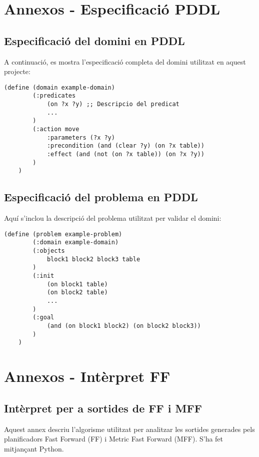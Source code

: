 \documentclass[a4paper]{article}
\begin{document}
	\newpage
	\appendix
	\section{Annexos - Especificació PDDL}
	
	\subsection{Especificació del domini en PDDL}
	
	A continuació, es mostra l'especificació completa del domini utilitzat en aquest projecte:
	
	\begin{lstlisting}[language=PDDL, caption={Especificació del domini en PDDL}, label={lst:dominiPDDL}]
	(define (domain example-domain)
		(:predicates
			(on ?x ?y) ;; Descripcio del predicat
			...
		)
		(:action move
			:parameters (?x ?y)
			:precondition (and (clear ?y) (on ?x table))
			:effect (and (not (on ?x table)) (on ?x ?y))
		)
	)
	\end{lstlisting}
	
	\subsection{Especificació del problema en PDDL}
	Aquí s'inclou la descripció del problema utilitzat per validar el domini:
	
	\begin{lstlisting}[language=PDDL, caption={Especificació del problema en PDDL}, label={lst:problemaPDDL}]
	(define (problem example-problem)
		(:domain example-domain)
		(:objects
			block1 block2 block3 table
		)
		(:init
			(on block1 table)
			(on block2 table)
			...
		)
		(:goal
			(and (on block1 block2) (on block2 block3))
		)
	)
	\end{lstlisting}
	
	\newpage
	\section{Annexos - Intèrpret FF}
	
	\subsection{Intèrpret per a sortides de FF i MFF}
	\label{sec:FFInterpreter.py}
	
	Aquest annex descriu l'algorisme utilitzat per analitzar les sortides generades pels planificadors Fast Forward (FF) i Metric Fast Forward (MFF). S'ha fet mitjançant Python. \\
	
\end{document}
